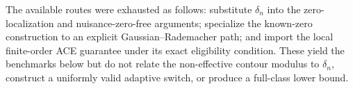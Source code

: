 The available routes were exhausted as follows: substitute \(\delta_n\) into the zero-localization and nuisance-zero-free arguments; specialize the known-zero construction to an explicit Gaussian--Rademacher path; and import the local finite-order ACE guarantee under its exact eligibility condition.  These yield the benchmarks below but do not relate the non-effective contour modulus to \(\delta_n\), construct a uniformly valid adaptive switch, or produce a full-class lower bound.
